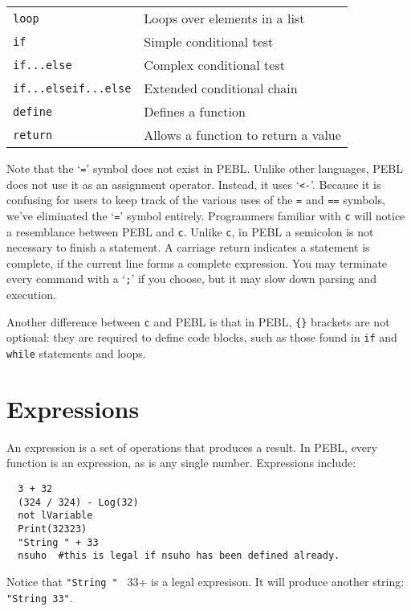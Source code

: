 \begin{table}[htbp]
\begin{tabular}{ll}
\texttt{loop}  &               Loops over elements in a list\\
\texttt{if}    &               Simple conditional test\\
\texttt{if...else}&            Complex conditional test\\
\texttt{if...elseif...else}&   Extended conditional chain\\
\texttt{define}   &            Defines a function\\
\texttt{return}&               Allows a function to return a value\\
\bottomrule
\end{tabular}
\label{tab:symbols}
\end{table}


Note that the `\verb+=+' symbol does not exist in PEBL. Unlike other languages, PEBL does not use it as an assignment operator. Instead, it uses `\verb+<-+'. Because it is confusing for users to keep track of the various uses of the \verb+=+ and \verb+==+ symbols, we've eliminated the `\verb+=+' symbol entirely. Programmers familiar with \texttt{c} will notice a resemblance between PEBL and \texttt{c}. Unlike \texttt{c}, in PEBL a semicolon is not necessary to finish a statement. A carriage return indicates a statement is complete, if the current line forms a complete expression. You may terminate every command with a `\texttt{;}' if you choose, but it may slow down parsing and execution.

Another difference between \texttt{c} and PEBL is that in PEBL, \verb+{}+ brackets are
not optional: they are required to define code blocks, such as those
found in \texttt{if} and \texttt{while} statements and loops.

\section{Expressions}

An expression is a set of operations that produces a
result.  In PEBL, every function is an expression, as is any
single number. Expressions include:
\begin{verbatim}
  3 + 32
  (324 / 324) - Log(32)
  not lVariable
  Print(32323)
  "String " + 33
  nsuho  #this is legal if nsuho has been defined already.
\end{verbatim}

Notice that \verb+"String " + 33+ is a legal expresison. It will
produce another string: \verb+"String 33"+.

